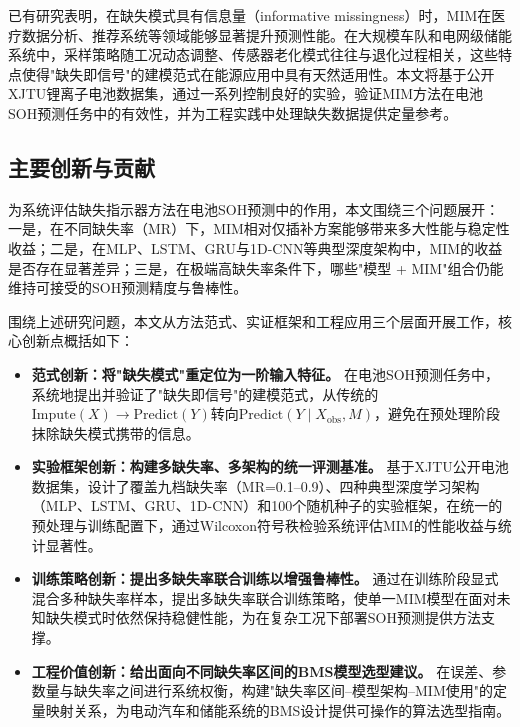 \documentclass[10pt,a4paper]{ctexart}
\begin{document}
已有研究表明，在缺失模式具有信息量（informative missingness）时，MIM在医疗数据分析、推荐系统等领域能够显著提升预测性能\cite{sisk2023imputation,ehrig2025imputation}。在大规模车队和电网级储能系统中，采样策略随工况动态调整、传感器老化模式往往与退化过程相关，这些特点使得"缺失即信号"的建模范式在能源应用中具有天然适用性。本文将基于公开XJTU锂离子电池数据集，通过一系列控制良好的实验，验证MIM方法在电池SOH预测任务中的有效性，并为工程实践中处理缺失数据提供定量参考。

\subsection{主要创新与贡献}

为系统评估缺失指示器方法在电池SOH预测中的作用，本文围绕三个问题展开：一是，在不同缺失率（MR）下，MIM相对仅插补方案能够带来多大性能与稳定性收益；二是，在MLP、LSTM、GRU与1D-CNN等典型深度架构中，MIM的收益是否存在显著差异；三是，在极端高缺失率条件下，哪些"模型 + MIM"组合仍能维持可接受的SOH预测精度与鲁棒性。

围绕上述研究问题，本文从方法范式、实证框架和工程应用三个层面开展工作，核心创新点概括如下：

\begin{itemize}
  \item \textbf{范式创新：将"缺失模式"重定位为一阶输入特征。} 在电池SOH预测任务中，系统地提出并验证了"缺失即信号"的建模范式，从传统的$\text{Impute}(X)\rightarrow\text{Predict}(Y)$转向$\text{Predict}(Y \mid X_{\mathrm{obs}}, M)$，避免在预处理阶段抹除缺失模式携带的信息。

  \item \textbf{实验框架创新：构建多缺失率、多架构的统一评测基准。} 基于XJTU公开电池数据集，设计了覆盖九档缺失率（MR=0.1--0.9）、四种典型深度学习架构（MLP、LSTM、GRU、1D-CNN）和100个随机种子的实验框架，在统一的预处理与训练配置下，通过Wilcoxon符号秩检验系统评估MIM的性能收益与统计显著性。

  \item \textbf{训练策略创新：提出多缺失率联合训练以增强鲁棒性。} 通过在训练阶段显式混合多种缺失率样本，提出多缺失率联合训练策略，使单一MIM模型在面对未知缺失模式时依然保持稳健性能，为在复杂工况下部署SOH预测提供方法支撑。

  \item \textbf{工程价值创新：给出面向不同缺失率区间的BMS模型选型建议。} 在误差、参数量与缺失率之间进行系统权衡，构建"缺失率区间--模型架构--MIM使用"的定量映射关系，为电动汽车和储能系统的BMS设计提供可操作的算法选型指南。
\end{itemize}
\end{document}
